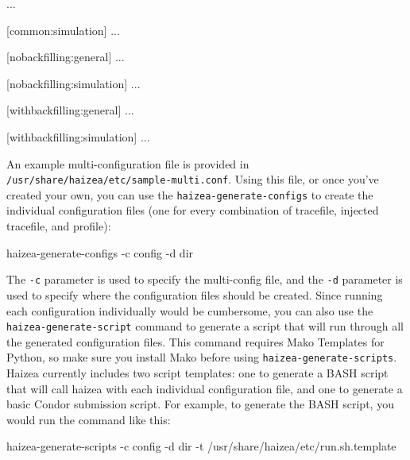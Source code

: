 \begin{wideshellverbatim}
...

[common:simulation]
...

[nobackfilling:general]
...

[nobackfilling:simulation]
...

[withbackfilling:general]
...

[withbackfilling:simulation]
...
\end{wideshellverbatim}

An example multi-configuration file is provided in \texttt{/usr/share/haizea/etc/sample-multi.conf}. Using this file, or once you've created your own, you can use the \texttt{haizea-generate-configs} to create the individual configuration files (one for every combination of tracefile, injected tracefile, and profile):

\begin{wideshellverbatim}
haizea-generate-configs -c config -d dir
\end{wideshellverbatim}

The \texttt{-c} parameter is used to specify the multi-config file, and the \texttt{-d} parameter is used to specify where the configuration files should be created. Since running each configuration individually would be cumbersome, you can also use the \texttt{haizea-generate-script} command to generate a script that will run through all the generated configuration files. This command requires Mako Templates for Python, so make sure you install Mako before using \texttt{haizea-generate-scripts}. Haizea currently includes two script templates: one to generate a BASH script that will call haizea with each individual configuration file, and one to generate a basic Condor submission script. For example, to generate the BASH script, you would run the command like this:

\begin{wideshellverbatim}
haizea-generate-scripts -c config -d dir -t /usr/share/haizea/etc/run.sh.template
\end{wideshellverbatim}
